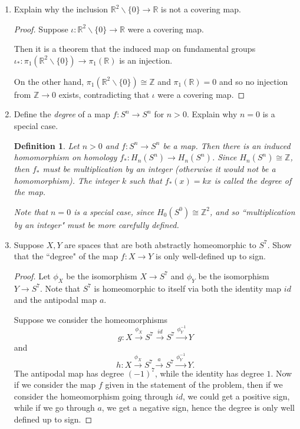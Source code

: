 \documentclass{article}
\newtheorem*{definition}{Definition}
\begin{document}
\begin{enumerate}
	\item Explain why the inclusion $\mathbb{R}^2 \backslash \{0\} \rightarrow \mathbb{R}$ is not a covering map.
	
	\begin{proof}
		Suppose $\iota : \mathbb{R}^2 \backslash \{ 0 \} \rightarrow \mathbb{R}$ were a covering map. 
		
		Then it is a theorem that the induced map on fundamental groups $\iota_*: \pi_1(\mathbb{R}^2 \backslash \{ 0 \}) \rightarrow \pi_1(\mathbb{R})$ is an injection. 
		
		On the other hand, $\pi_1 (\mathbb{R}^2 \backslash \{ 0 \}) \cong \mathbb{Z}$ and $\pi_1( \mathbb{R} ) = 0$ and so no injection from $\mathbb{Z} \rightarrow 0$ exists, contradicting that $\iota$ were a covering map.
	\end{proof} 
	
	\item Define the \textit{degree} of a map $f: S^n \rightarrow S^n$ for $n > 0$. Explain why $n=0$ is a special case.
	
	\begin{definition}
		Let $n>0$ and $f: S^n \rightarrow S^n$ be a map. Then there is an induced homomorphism on homology $f_* : H_n (S^n) \rightarrow H_n (S^n)$. Since $H_n(S^n) \cong \mathbb{Z}$, then $f_*$ must be multiplication by an integer (otherwise it would not be a homomorphism). The integer $k$ such that $f_*(x) = kx$ is called the degree of the map.
		
		Note that $n=0$ is a special case, since $H_0(S^0) \cong \mathbb{Z}^2$, and so ``multiplication by an integer" must be more carefully defined.
	\end{definition}
	
	\item Suppose $X, Y$ are spaces that are both abstractly homeomorphic to $S^7$. Show that the ``degree" of the map $f: X \rightarrow Y$ is only well-defined up to sign.
	
	\begin{proof}
	Let $\phi_X$ be the isomorphism $X \rightarrow S^7$ and $\phi_Y$ be the isomorphism $Y \rightarrow S^7$.
	Note that $S^7$ is homeomorphic to itself via both the identity map $id$ and the antipodal map $a$.
	
	Suppose we consider the homeomorphisms
	\[ g: X \stackrel{\phi_X}{\rightarrow} S^7 \stackrel{id}{\rightarrow} S^7 \stackrel{\phi_Y^{-1}}{\rightarrow} Y \]
	and
	\[ h: X \stackrel{\phi_X}{\rightarrow} S^7 \stackrel{a}{\rightarrow} S^7 \stackrel{\phi_Y^{-1}}{\rightarrow} Y. \]
	The antipodal map has degree $(-1)^7$, while the identity has degree $1$.
	Now if we consider the map $f$ given in the statement of the problem, then if we consider the homeomorphism going through $id$, we could get a positive sign,
	while if we go through $a$, we get a negative sign, hence the degree is only well defined up to sign.
	\end{proof}
	

\end{enumerate}
\end{document}

